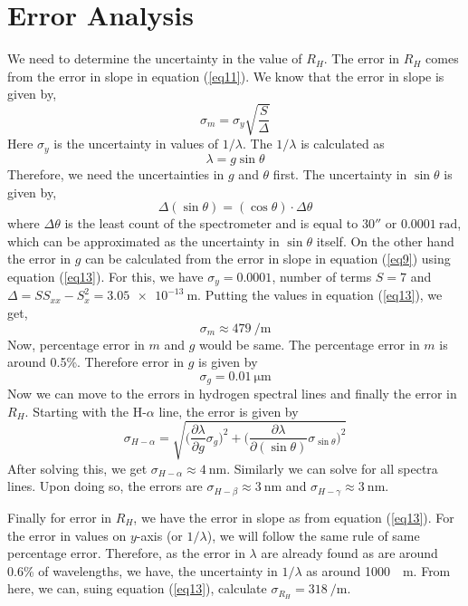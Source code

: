 \documentclass[%
 reprint,
 amsmath,amssymb,
 aps,
]{revtex4-2}
\begin{document}
\section{Error Analysis}
We need to determine the uncertainty in the value of $R_H$. The error in $R_H$ comes from the error in slope in equation (\ref{eq11}). We know that the error in slope is given by,
\begin{equation}
\label{eq13}
    \sigma_m = \sigma_y \sqrt{\dfrac{S}{\Delta}}
\end{equation}
Here $\sigma_y$ is the uncertainty in values of $1/ \lambda$. The $1/ \lambda$ is calculated as
\begin{equation}
    \lambda = g \sin \theta
\end{equation}
Therefore, we need the uncertainties in $g$ and $\theta$ first. The uncertainty in $\sin \theta$ is given by,
\begin{equation}
    \Delta(\sin \theta) = (\cos \theta) \cdot \Delta \theta
\end{equation}
where $\Delta \theta$ is the least count of the spectrometer and is equal to $30''$ or $\SI{0.0001}{\radian}$, which can be approximated as the uncertainty in $\sin \theta$ itself. On the other hand the error in $g$ can be calculated from the error in slope in equation (\ref{eq9}) using equation (\ref{eq13}). For this, we have $\sigma_y = 0.0001$, number of terms $S = 7$ and $\Delta = S S_{xx} - S_{x}^2 = \SI{3.05e-13}{\metre}$. Putting the values in equation (\ref{eq13}), we get, 
\begin{equation}
    \sigma_m \approx \SI{479}{\per \metre}
\end{equation}
Now, percentage error in $m$ and $g$ would be same. The percentage error in $m$ is around 0.5\%. Therefore error in $g$ is given by 
\begin{equation}
    \sigma_g = \SI{0.01}{\micro \metre}
\end{equation}
Now we can move to the errors in hydrogen spectral lines and finally the error in $R_H$. Starting with the H-$\alpha$ line, the error is given by
\begin{equation}
    \sigma_{H-\alpha} = \sqrt{\Bigg(\dfrac{\partial \lambda}{\partial g}\sigma_g \Bigg)^2 + \Bigg(\dfrac{\partial \lambda}{\partial (\sin \theta)}\sigma_{\sin \theta} \Bigg)^2}
\end{equation}
After solving this, we get $\sigma_{H-\alpha} \approx \SI{4}{\nano \metre}$. Similarly we can solve for all spectra lines. Upon doing so, the errors are $\sigma_{H-\beta} \approx \SI{3}{\nano \metre}$ and $\sigma_{H-\gamma} \approx \SI{3}{\nano \metre}$.
\par
Finally for error in $R_H$, we have the error in slope as from equation (\ref{eq13}). For the error in values on $y$-axis (or $1/\lambda$), we will follow the same rule of same percentage error. Therefore, as the error in $\lambda$ are already found as are around 0.6\% of wavelengths, we have, the uncertainty in $1/\lambda$ as around \SI{1000}{\per \metre}.
From here, we can, suing equation (\ref{eq13}), calculate $\sigma_{R_H} = \SI{318}{\per \metre}$.
\end{document}

